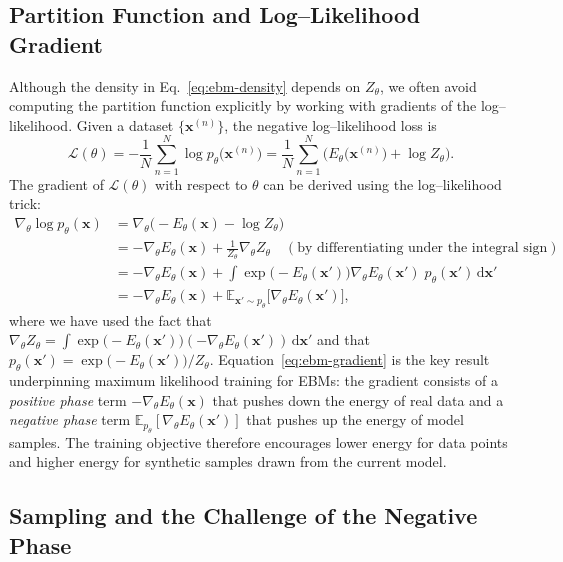 \subsection{Partition Function and Log–Likelihood Gradient}

Although the density in Eq.~\eqref{eq:ebm-density} depends on $Z_\theta$, we
often avoid computing the partition function explicitly by working with
gradients of the log–likelihood.  Given a dataset $\{\mathbf{x}^{(n)}\}$, the
negative log–likelihood loss is
\begin{equation}
    \mathcal{L}(\theta) = -\frac{1}{N}\sum_{n=1}^N \log p_\theta\big(\mathbf{x}^{(n)}\big)
    = \frac{1}{N}\sum_{n=1}^N \Big(E_\theta\big(\mathbf{x}^{(n)}\big) + \log Z_\theta\Big).
\end{equation}
The gradient of $\mathcal{L}(\theta)$ with respect to $\theta$ can be derived
using the log–likelihood trick:
\begin{align}
    \nabla_\theta \log p_\theta(\mathbf{x})
    &= \nabla_\theta \big(-E_\theta(\mathbf{x}) - \log Z_\theta\big) \\
    &= -\nabla_\theta E_\theta(\mathbf{x}) + \frac{1}{Z_\theta} \nabla_\theta Z_\theta
      \quad (\text{by differentiating under the integral sign}) \\
    &= -\nabla_\theta E_\theta(\mathbf{x}) + \int \exp\big(-E_\theta(\mathbf{x}')\big)
      \nabla_\theta E_\theta(\mathbf{x}') \; p_\theta(\mathbf{x}') \,\mathrm{d}\mathbf{x}' \\
    &= -\nabla_\theta E_\theta(\mathbf{x}) + \mathbb{E}_{\mathbf{x}' \sim p_\theta}
      \big[\nabla_\theta E_\theta(\mathbf{x}')\big],
    \label{eq:ebm-gradient}
\end{align}
where we have used the fact that $\nabla_\theta Z_\theta = \int 
\exp\big(-E_\theta(\mathbf{x}')\big)(-\nabla_\theta E_\theta(\mathbf{x}'))\,\mathrm{d}\mathbf{x}'$
and that $p_\theta(\mathbf{x}') = \exp\big(-E_\theta(\mathbf{x}')\big)/Z_\theta$.
Equation~\eqref{eq:ebm-gradient} is the key result underpinning maximum
likelihood training for EBMs: the gradient consists of a \emph{positive
phase} term $-\nabla_\theta E_\theta(\mathbf{x})$ that pushes down the energy
of real data and a \emph{negative phase} term $\mathbb{E}_{p_\theta}[\nabla_\theta
E_\theta(\mathbf{x}')]$ that pushes up the energy of model samples.  The
training objective therefore encourages lower energy for data points and
higher energy for synthetic samples drawn from the current model.

\subsection{Sampling and the Challenge of the Negative Phase}

